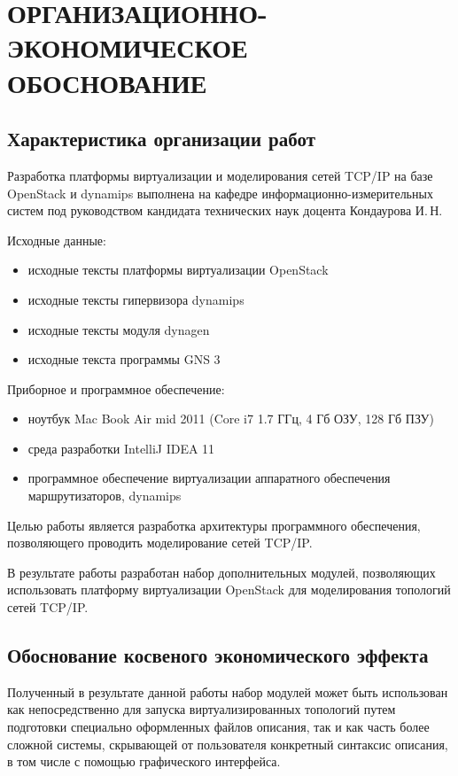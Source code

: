 \chapter{ОРГАНИЗАЦИОННО-ЭКОНОМИЧЕСКОЕ ОБОСНОВАНИЕ}

\section{Характеристика организации работ}

Разработка платформы виртуализации и моделирования сетей TCP/IP на базе OpenStack и dynamips выполнена на кафедре информационно-измерительных систем под руководством кандидата технических наук доцента Кондаурова И.\,Н. 

Исходные данные: 
\begin{itemize}
   \item исходные тексты платформы виртуализации OpenStack
   \item исходные тексты гипервизора dynamips
   \item исходные тексты модуля dynagen
   \item исходные текста программы GNS 3
\end{itemize}

Приборное и программное обеспечение:
\begin{itemize}
    \item ноутбук Mac Book Air mid 2011 (Core i7 1.7 ГГц, 4 Гб ОЗУ, 128 Гб ПЗУ)
    \item среда разработки IntelliJ IDEA 11
    \item программное обеспечение виртуализации аппаратного обеспечения маршрутизаторов, dynamips
\end{itemize}

Целью работы является разработка архитектуры программного обеспечения, позволяющего проводить моделирование сетей TCP/IP.

В результате работы разработан набор дополнительных модулей, позволяющих 
использовать платформу виртуализации OpenStack для моделирования топологий сетей TCP/IP.

\section{Обоснование косвеного экономического эффекта}

Полученный в результате данной работы набор модулей может быть использован как 
непосредственно для запуска виртуализированных топологий путем подготовки специально
оформленных файлов описания, так и как часть более сложной системы, скрывающей от
пользователя конкретный синтаксис описания, в том числе с помощью графического 
интерфейса.

